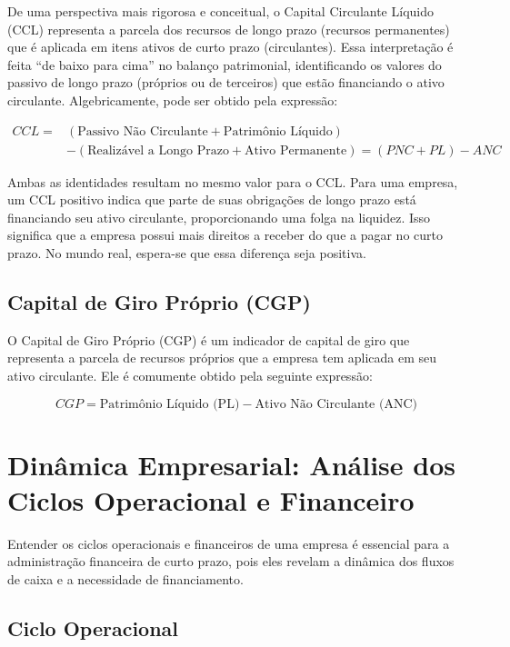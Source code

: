 \documentclass[
  a4paper,
]{book}
\begin{document}
De uma perspectiva mais rigorosa e conceitual, o Capital Circulante
Líquido (CCL) representa a parcela dos recursos de longo prazo (recursos
permanentes) que é aplicada em itens ativos de curto prazo
(circulantes). Essa interpretação é feita ``de baixo para cima'' no
balanço patrimonial, identificando os valores do passivo de longo prazo
(próprios ou de terceiros) que estão financiando o ativo circulante.
Algebricamente, pode ser obtido pela expressão:

\[
\begin{split}
CCL = & (\text{Passivo Não Circulante} + \text{Patrimônio Líquido}) \\
      & - (\text{Realizável a Longo Prazo} + \text{Ativo Permanente}) = (PNC + PL) - ANC
\end{split}
\]

Ambas as identidades resultam no mesmo valor para o CCL. Para uma
empresa, um CCL positivo indica que parte de suas obrigações de longo
prazo está financiando seu ativo circulante, proporcionando uma folga na
liquidez. Isso significa que a empresa possui mais direitos a receber do
que a pagar no curto prazo. No mundo real, espera-se que essa diferença
seja positiva.

\subsection{Capital de Giro Próprio
(CGP)}\label{capital-de-giro-pruxf3prio-cgp}

O Capital de Giro Próprio (CGP) é um indicador de capital de giro que
representa a parcela de recursos próprios que a empresa tem aplicada em
seu ativo circulante. Ele é comumente obtido pela seguinte expressão:

\[CGP = \text{Patrimônio Líquido (PL)} - \text{Ativo Não Circulante (ANC)}\]

\section{Dinâmica Empresarial: Análise dos Ciclos Operacional e
Financeiro}\label{dinuxe2mica-empresarial-anuxe1lise-dos-ciclos-operacional-e-financeiro}

Entender os ciclos operacionais e financeiros de uma empresa é essencial
para a administração financeira de curto prazo, pois eles revelam a
dinâmica dos fluxos de caixa e a necessidade de financiamento.

\subsection{Ciclo Operacional}\label{ciclo-operacional}
\end{document}
